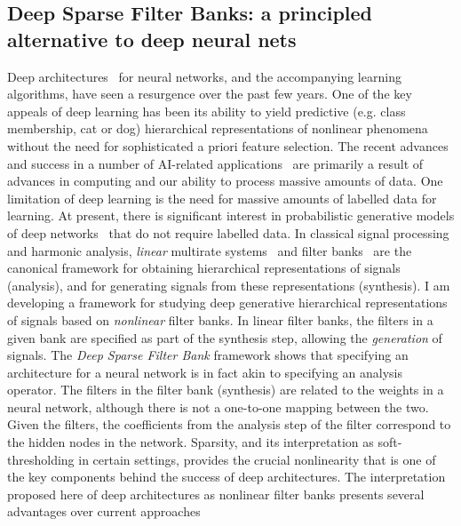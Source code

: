 \documentclass[12pt]{article}
\begin{document}
\subsection*{Deep Sparse Filter Banks: a principled alternative to deep neural nets}

Deep architectures~\cite{lecun2015deep} for neural networks, and the accompanying learning algorithms,  have seen a resurgence over the past few years. One of the key appeals of deep learning has been its ability to yield predictive (e.g. class membership, cat or dog) hierarchical representations of nonlinear phenomena without the need for sophisticated a priori feature selection. The recent advances and success in a number of AI-related applications~\cite{bengio2009learning} are primarily a result of advances in computing and our ability to process massive amounts of data. One limitation of deep learning is the need for massive amounts of labelled data for learning. At present, there is significant interest in probabilistic generative models of deep networks~\cite{patel2015probabilistic} that do not require labelled data. %
In classical signal processing and harmonic analysis, \emph{linear} multirate systems~\cite{fliege1994multirate} and filter banks~\cite{strang1996wavelets,daubechies1992ten} are the canonical framework for obtaining hierarchical representations of signals (analysis), and for generating signals from these representations (synthesis). I am developing a framework for studying deep generative hierarchical representations of signals based on \emph{nonlinear} filter banks. In linear filter banks, the filters in a given bank are specified as part of the synthesis step, allowing the \emph{generation} of signals. The \emph{Deep Sparse Filter Bank} framework shows that specifying an architecture for a neural network is in fact akin to specifying an analysis operator. The filters in the filter bank (synthesis) are related to the weights in a neural network, although there is not a one-to-one mapping between the two. Given the filters, the coefficients from the analysis step of the filter correspond to the hidden nodes in the network. Sparsity, and its interpretation as soft-thresholding in certain settings, provides the crucial nonlinearity that is one of the key components behind the success of deep architectures. The interpretation proposed here of deep architectures as nonlinear filter banks presents several advantages over current approaches
\end{document}
